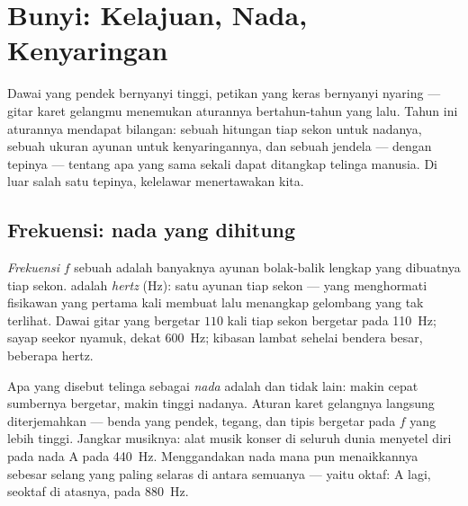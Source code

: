 \chapter{Bunyi: Kelajuan, Nada, Kenyaringan}\label{ch:g8:sound-pitch-loudness}

Dawai yang pendek bernyanyi tinggi, petikan yang keras bernyanyi
nyaring --- gitar karet gelangmu menemukan aturannya bertahun-tahun
yang lalu. Tahun ini aturannya mendapat bilangan: sebuah hitungan tiap
sekon untuk nadanya, sebuah ukuran ayunan untuk kenyaringannya, dan
sebuah jendela --- dengan tepinya --- tentang apa yang sama sekali dapat
ditangkap telinga manusia. Di luar salah satu tepinya, kelelawar
menertawakan kita.

\section{Frekuensi: nada yang dihitung}

\begin{definition}[Frekuensi]\label{def:g8:sound-pitch-loudness:frequency}
\emph{Frekuensi} $f$ sebuah  adalah banyaknya
ayunan bolak-balik lengkap yang dibuatnya tiap sekon.  adalah
\emph{hertz} (\unit{Hz}): satu ayunan tiap sekon ---
yang menghormati fisikawan yang pertama kali membuat lalu menangkap
gelombang yang tak terlihat. Dawai gitar yang bergetar $110$ kali tiap
sekon bergetar pada \qty{110}{Hz}; sayap seekor nyamuk, dekat
\qty{600}{Hz}; kibasan lambat sehelai bendera besar, beberapa hertz.
\end{definition}

\begin{proposition}\label{prop:g8:sound-pitch-loudness:pitch}
Apa yang disebut telinga sebagai \emph{nada} adalah  dan
tidak lain: makin cepat sumbernya bergetar, makin tinggi nadanya.
Aturan karet gelangnya langsung diterjemahkan --- benda yang pendek,
tegang, dan tipis bergetar pada $f$ yang lebih tinggi. Jangkar
musiknya: alat musik konser di seluruh dunia menyetel diri pada nada A
pada \qty{440}{Hz}. Menggandakan  nada mana pun menaikkannya
sebesar selang yang paling selaras di antara semuanya --- yaitu oktaf:
A lagi, seoktaf di atasnya, pada \qty{880}{Hz}.
\end{proposition}

